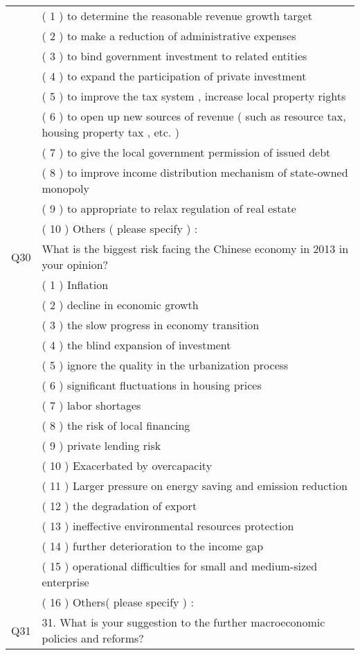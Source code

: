 \documentclass[10pt]{article}
\begin{document}
\begin{longtable}{p{1.5cm}p{13.5cm}}
	&	( 1 ) to determine the reasonable revenue growth target	\\
	&	( 2 ) to make a reduction of administrative expenses 	\\
	&	( 3 ) to bind government investment to related entities	\\
	&	( 4 ) to expand the participation of private investment 	\\
	&	( 5 ) to improve the tax system , increase local property rights	\\
	&	( 6 ) to open up new sources of revenue ( such as resource tax, housing property tax , etc. )	\\
	&	( 7 ) to give the local government permission of issued debt	\\
	&	( 8 ) to improve income distribution mechanism of state-owned monopoly	\\
	&	( 9 ) to appropriate to relax regulation of real estate	\\
	&	( 10 ) Others ( please specify ) :	\\
Q30	&	What is the biggest risk facing the Chinese economy in 2013 in your opinion? 	\\
	&	( 1 ) Inflation	\\
	&	( 2 ) decline in economic growth	\\
	&	( 3 ) the slow progress in economy transition	\\
	&	( 4 ) the blind expansion of investment	\\
	&	( 5 ) ignore the quality in the urbanization process	\\
	&	( 6 ) significant fluctuations in housing prices	\\
	&	( 7 ) labor shortages	\\
	&	( 8 ) the risk of local financing	\\
	&	( 9 ) private lending risk	\\
	&	( 10 ) Exacerbated by overcapacity	\\
	&	( 11 ) Larger pressure on energy saving and emission reduction	\\
	&	( 12 ) the degradation of export 	\\
	&	( 13 ) ineffective environmental resources protection 	\\
	&	( 14 ) further deterioration to the income gap	\\
	&	( 15 ) operational difficulties for small and medium-sized enterprise	\\
	&	( 16 ) Others( please specify ) :	\\
Q31	&	31. What is your suggestion to the further macroeconomic policies and reforms?	\\
\hline
		
	\end{longtable}
\end{document}
